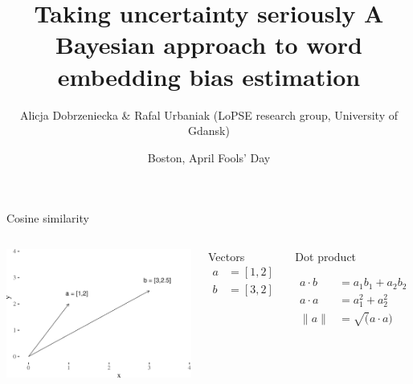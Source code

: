 \documentclass[
  10pt,
  ignorenonframetext,
  x11names, dvipsnames, bibspacing, natbib, table]{beamer}
\title{\Large Taking uncertainty seriously \newline \normalsize A
Bayesian approach to word embedding bias estimation}
\author{Alicja Dobrzeniecka \& Rafal Urbaniak
\footnotesize \newline (LoPSE research group, University of Gdansk)}
\date{Boston, April Fools' Day}
\begin{document}
\frame{\titlepage}

\begin{frame}{Cosine similarity}
\protect\hypertarget{cosine-similarity}{}
\begin{columns}
    

\begin{center}\includegraphics[width=1\linewidth]{tryOut_files/figure-beamer/cosine1-1} \end{center}



\footnotesize 

\begin{block}{Vectors}
\begin{align*}
a  & = [1,2]\\
b  &= [3,2]
\end{align*}

\end{block}
\pause 

\begin{block}{Dot product}


\begin{align*}
a \cdot b & = a_1 b_1 + a_2 b_2\\
a \cdot a & = a_1^2 + a_2 ^ 2 \\
\lVert a\rVert & = \sqrt(a \cdot a)
\end{align*}

\end{block}



\end{columns}
\end{frame}
\end{document}
